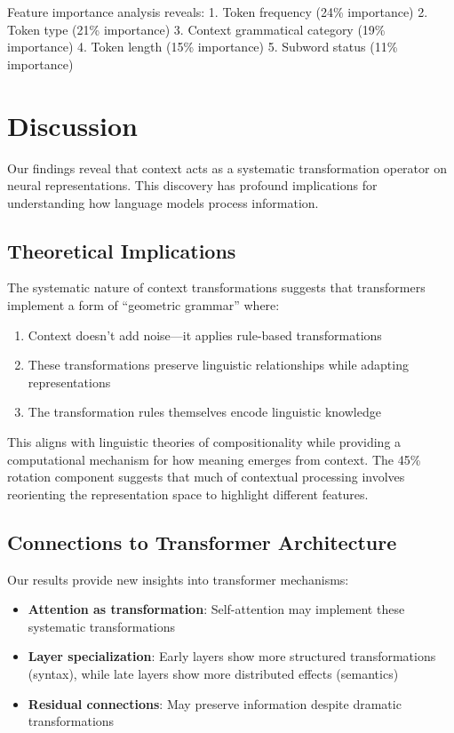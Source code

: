 \documentclass[11pt]{article}
\begin{document}
Feature importance analysis reveals:
1. Token frequency (24\% importance)
2. Token type (21\% importance)
3. Context grammatical category (19\% importance)
4. Token length (15\% importance)
5. Subword status (11\% importance)

\section{Discussion}

Our findings reveal that context acts as a systematic transformation operator on neural representations. This discovery has profound implications for understanding how language models process information.

\subsection{Theoretical Implications}

The systematic nature of context transformations suggests that transformers implement a form of ``geometric grammar'' where:
\begin{enumerate}
\item Context doesn't add noise---it applies rule-based transformations
\item These transformations preserve linguistic relationships while adapting representations
\item The transformation rules themselves encode linguistic knowledge
\end{enumerate}

This aligns with linguistic theories of compositionality while providing a computational mechanism for how meaning emerges from context. The 45\% rotation component suggests that much of contextual processing involves reorienting the representation space to highlight different features.

\subsection{Connections to Transformer Architecture}

Our results provide new insights into transformer mechanisms:
\begin{itemize}
\item \textbf{Attention as transformation}: Self-attention may implement these systematic transformations
\item \textbf{Layer specialization}: Early layers show more structured transformations (syntax), while late layers show more distributed effects (semantics)
\item \textbf{Residual connections}: May preserve information despite dramatic transformations
\end{itemize}
\end{document}
